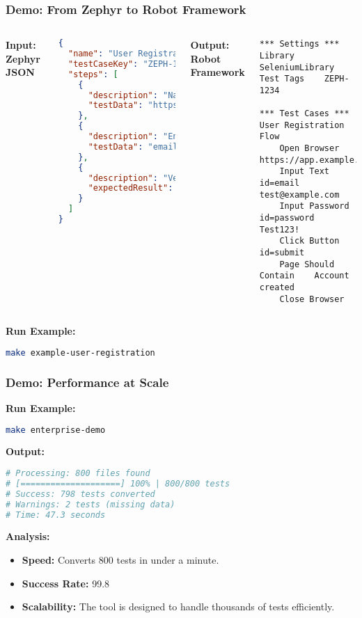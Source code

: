 \begin{frame}[fragile]
\frametitle{Demo: From Zephyr to Robot Framework}
\begin{columns}
\textbf{Input: Zephyr JSON}
\begin{lstlisting}[language=json,basicstyle=\tiny]
{
  "name": "User Registration Flow",
  "testCaseKey": "ZEPH-1234",
  "steps": [
    {
      "description": "Navigate to registration page",
      "testData": "https://app.example.com/register"
    },
    {
      "description": "Enter user details",
      "testData": "email: test@example.com, password: Test123!"
    },
    {
      "description": "Verify account creation",
      "expectedResult": "Account created successfully"
    }
  ]
}
\end{lstlisting}

\textbf{Output: Robot Framework}
\begin{lstlisting}[language=robot,basicstyle=\tiny]
*** Settings ***
Library    SeleniumLibrary
Test Tags    ZEPH-1234

*** Test Cases ***
User Registration Flow
    Open Browser    https://app.example.com/register
    Input Text    id=email    test@example.com
    Input Password    id=password    Test123!
    Click Button    id=submit
    Page Should Contain    Account created
    Close Browser
\end{lstlisting}
\end{columns}
\textbf{Run Example:}
\begin{lstlisting}[language=bash,basicstyle=\scriptsize]
make example-user-registration
\end{lstlisting}
\end{frame}

\begin{frame}[fragile]
\frametitle{Demo: Performance at Scale}
\textbf{Run Example:}
\begin{lstlisting}[language=bash,basicstyle=\scriptsize]
make enterprise-demo
\end{lstlisting}
\textbf{Output:}
\begin{lstlisting}[language=bash,basicstyle=\scriptsize]
# Processing: 800 files found
# [====================] 100% | 800/800 tests
# Success: 798 tests converted
# Warnings: 2 tests (missing data)
# Time: 47.3 seconds
\end{lstlisting}
\textbf{Analysis:}
\begin{itemize}
    \item \textbf{Speed:} Converts 800 tests in under a minute.
    \item \textbf{Success Rate:} 99.8%
    \item \textbf{Scalability:}  The tool is designed to handle thousands of tests efficiently.
\end{itemize}
\end{frame}

